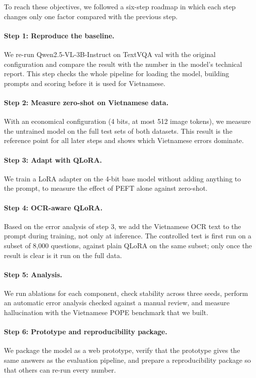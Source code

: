 To reach these objectives, we followed a six-step roadmap in which each step
changes only one factor compared with the previous step.

\paragraph{Step 1: Reproduce the baseline.} We re-run Qwen2.5-VL-3B-Instruct on
TextVQA val with the original configuration and compare the result with the number
in the model's technical report. This step checks the whole pipeline for loading the
model, building prompts and scoring before it is used for Vietnamese.

\paragraph{Step 2: Measure zero-shot on Vietnamese data.} With an economical
configuration (4 bits, at most 512 image tokens), we measure the untrained
model on the full test sets of both datasets. This result is the reference point
for all later steps and shows which Vietnamese errors dominate.

\paragraph{Step 3: Adapt with QLoRA.} We train a LoRA adapter on the 4-bit
base model without adding anything to the prompt, to measure the effect of PEFT
alone against zero-shot.

\paragraph{Step 4: OCR-aware QLoRA.} Based on the error analysis of step 3, we
add the Vietnamese OCR text to the prompt during training, not only at inference. The controlled
test is first run on a subset of 8,000 questions, against plain QLoRA on the same
subset; only once the result is clear is it run on the full data.

\paragraph{Step 5: Analysis.} We run ablations for each component, check
stability across three seeds, perform an automatic error analysis checked against a
manual review, and measure hallucination with the Vietnamese POPE benchmark that we
built.

\paragraph{Step 6: Prototype and reproducibility package.} We package the model
as a web prototype, verify that the prototype gives the same answers as the
evaluation pipeline, and prepare a reproducibility package so that others can
re-run every number.

